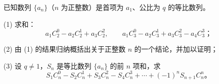 \begin{question}
已知数列 \(\{a_n\}\)（\(n\) 为正整数）是首项为 \(a_1\)、公比为 \(q\) 的等比数列。

    (1) 求和：
\nopagebreak[4]
\[
    a_1C_2^0-a_2C_2^1+a_3C_2^2,\qquad
    a_1C_3^0-a_2C_3^1+a_3C_3^2-a_4C_3^3；
\]

    (2) 由 (1) 的结果归纳概括出关于正整数 \(n\) 的一个结论，并加以证明；

    (3) 设 \(q\ne1\)，\(S_n\) 是等比数列 \(\{a_n\}\) 的前 \(n\) 项和，求
\nopagebreak[4]
\[
    S_1C_n^0-S_2C_n^1+S_3C_n^2-S_4C_n^3+\cdots+(-1)^nS_{n+1}C_n^n\mbox{。}
\]

\end{question}